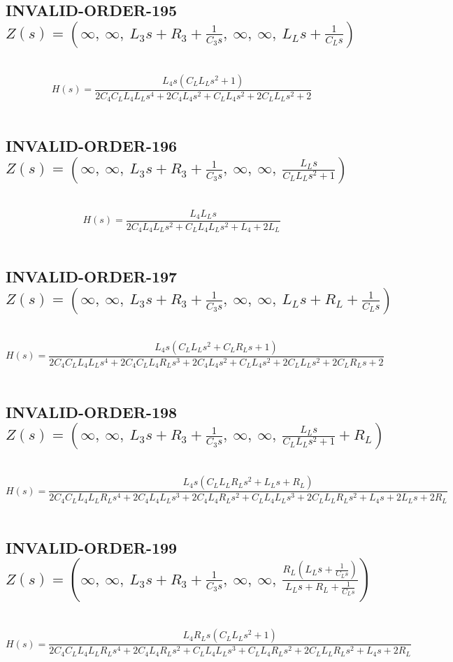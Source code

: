 \documentclass{article}
\begin{document}
\subsection{INVALID-ORDER-195 $Z(s) = \left( \infty, \  \infty, \  L_{3} s + R_{3} + \frac{1}{C_{3} s}, \  \infty, \  \infty, \  L_{L} s + \frac{1}{C_{L} s}\right)$ } \ 
\textbf{\[H(s) = \frac{L_{4} s \left(C_{L} L_{L} s^{2} + 1\right)}{2 C_{4} C_{L} L_{4} L_{L} s^{4} + 2 C_{4} L_{4} s^{2} + C_{L} L_{4} s^{2} + 2 C_{L} L_{L} s^{2} + 2}\] } \ 
\subsection{INVALID-ORDER-196 $Z(s) = \left( \infty, \  \infty, \  L_{3} s + R_{3} + \frac{1}{C_{3} s}, \  \infty, \  \infty, \  \frac{L_{L} s}{C_{L} L_{L} s^{2} + 1}\right)$ } \ 
\textbf{\[H(s) = \frac{L_{4} L_{L} s}{2 C_{4} L_{4} L_{L} s^{2} + C_{L} L_{4} L_{L} s^{2} + L_{4} + 2 L_{L}}\] } \ 
\subsection{INVALID-ORDER-197 $Z(s) = \left( \infty, \  \infty, \  L_{3} s + R_{3} + \frac{1}{C_{3} s}, \  \infty, \  \infty, \  L_{L} s + R_{L} + \frac{1}{C_{L} s}\right)$ } \ 
\textbf{\[H(s) = \frac{L_{4} s \left(C_{L} L_{L} s^{2} + C_{L} R_{L} s + 1\right)}{2 C_{4} C_{L} L_{4} L_{L} s^{4} + 2 C_{4} C_{L} L_{4} R_{L} s^{3} + 2 C_{4} L_{4} s^{2} + C_{L} L_{4} s^{2} + 2 C_{L} L_{L} s^{2} + 2 C_{L} R_{L} s + 2}\] } \ 
\subsection{INVALID-ORDER-198 $Z(s) = \left( \infty, \  \infty, \  L_{3} s + R_{3} + \frac{1}{C_{3} s}, \  \infty, \  \infty, \  \frac{L_{L} s}{C_{L} L_{L} s^{2} + 1} + R_{L}\right)$ } \ 
\textbf{\[H(s) = \frac{L_{4} s \left(C_{L} L_{L} R_{L} s^{2} + L_{L} s + R_{L}\right)}{2 C_{4} C_{L} L_{4} L_{L} R_{L} s^{4} + 2 C_{4} L_{4} L_{L} s^{3} + 2 C_{4} L_{4} R_{L} s^{2} + C_{L} L_{4} L_{L} s^{3} + 2 C_{L} L_{L} R_{L} s^{2} + L_{4} s + 2 L_{L} s + 2 R_{L}}\] } \ 
\subsection{INVALID-ORDER-199 $Z(s) = \left( \infty, \  \infty, \  L_{3} s + R_{3} + \frac{1}{C_{3} s}, \  \infty, \  \infty, \  \frac{R_{L} \left(L_{L} s + \frac{1}{C_{L} s}\right)}{L_{L} s + R_{L} + \frac{1}{C_{L} s}}\right)$ } \ 
\textbf{\[H(s) = \frac{L_{4} R_{L} s \left(C_{L} L_{L} s^{2} + 1\right)}{2 C_{4} C_{L} L_{4} L_{L} R_{L} s^{4} + 2 C_{4} L_{4} R_{L} s^{2} + C_{L} L_{4} L_{L} s^{3} + C_{L} L_{4} R_{L} s^{2} + 2 C_{L} L_{L} R_{L} s^{2} + L_{4} s + 2 R_{L}}\] } \ 
\end{document}
